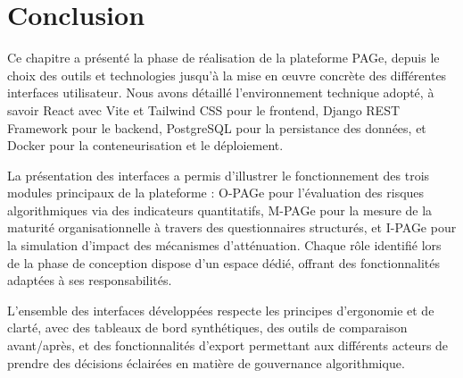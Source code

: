 \section{Conclusion}

Ce chapitre a présenté la phase de réalisation de la plateforme PAGe, depuis le choix des outils et technologies jusqu'à la mise en œuvre concrète des différentes interfaces utilisateur. Nous avons détaillé l'environnement technique adopté, à savoir React avec Vite et Tailwind CSS pour le frontend, Django REST Framework pour le backend, PostgreSQL pour la persistance des données, et Docker pour la conteneurisation et le déploiement.

La présentation des interfaces a permis d'illustrer le fonctionnement des trois modules principaux de la plateforme : O-PAGe pour l'évaluation des risques algorithmiques via des indicateurs quantitatifs, M-PAGe pour la mesure de la maturité organisationnelle à travers des questionnaires structurés, et I-PAGe pour la simulation d'impact des mécanismes d'atténuation. Chaque rôle identifié lors de la phase de conception dispose d'un espace dédié, offrant des fonctionnalités adaptées à ses responsabilités.

L'ensemble des interfaces développées respecte les principes d'ergonomie et de clarté, avec des tableaux de bord synthétiques, des outils de comparaison avant/après, et des fonctionnalités d'export permettant aux différents acteurs de prendre des décisions éclairées en matière de gouvernance algorithmique.
